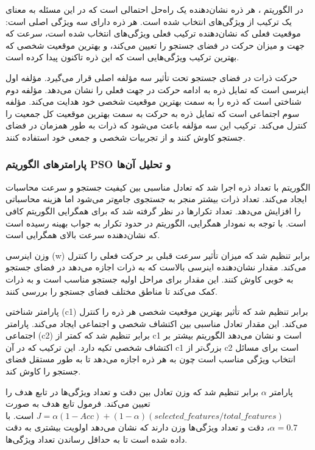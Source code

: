 \documentclass{article}
\begin{document}
در الگوریتم ، هر ذره نشان‌دهنده یک راه‌حل احتمالی است که در این مسئله به معنای یک ترکیب از ویژگی‌های انتخاب شده است. هر ذره دارای سه ویژگی اصلی است: موقعیت فعلی که نشان‌دهنده ترکیب فعلی ویژگی‌های انتخاب شده است، سرعت که جهت و میزان حرکت در فضای جستجو را تعیین می‌کند، و بهترین موقعیت شخصی که بهترین ترکیب ویژگی‌هایی است که این ذره تاکنون پیدا کرده است.

حرکت ذرات در فضای جستجو تحت تأثیر سه مؤلفه اصلی قرار می‌گیرد. مؤلفه اول اینرسی است که تمایل ذره به ادامه حرکت در جهت فعلی را نشان می‌دهد. مؤلفه دوم شناختی است که ذره را به سمت بهترین موقعیت شخصی خود هدایت می‌کند. مؤلفه سوم اجتماعی است که تمایل ذره به حرکت به سمت بهترین موقعیت کل جمعیت را کنترل می‌کند. ترکیب این سه مؤلفه باعث می‌شود که ذرات به طور همزمان در فضای جستجو کاوش کنند و از تجربیات شخصی و جمعی خود استفاده کنند.

\subsubsection{پارامترهای الگوریتم PSO و تحلیل آن‌ها}

الگوریتم  با تعداد  ذره اجرا شد که تعادل مناسبی بین کیفیت جستجو و سرعت محاسبات ایجاد می‌کند. تعداد ذرات بیشتر منجر به جستجوی جامع‌تر می‌شود اما هزینه محاسباتی را افزایش می‌دهد. تعداد تکرارها  در نظر گرفته شد که برای همگرایی الگوریتم کافی است. با توجه به نمودار همگرایی، الگوریتم در حدود تکرار  به جواب بهینه رسیده است که نشان‌دهنده سرعت بالای همگرایی است.

وزن اینرسی (w) برابر  تنظیم شد که میزان تأثیر سرعت قبلی بر حرکت فعلی را کنترل می‌کند. مقدار  نشان‌دهنده اینرسی بالاست که به ذرات اجازه می‌دهد در فضای جستجو به خوبی کاوش کنند. این مقدار برای مراحل اولیه جستجو مناسب است و به ذرات کمک می‌کند تا مناطق مختلف فضای جستجو را بررسی کنند.

پارامتر شناختی (c1) برابر  تنظیم شد که تأثیر بهترین موقعیت شخصی هر ذره را کنترل می‌کند. این مقدار تعادل مناسبی بین اکتشاف شخصی و اجتماعی ایجاد می‌کند. پارامتر اجتماعی (c2) برابر  تنظیم شد که کمتر از c1 است و نشان می‌دهد الگوریتم بیشتر بر اکتشاف شخصی تکیه دارد. این ترکیب که در آن c1 بزرگ‌تر از c2 است برای مسائل انتخاب ویژگی مناسب است چون به هر ذره اجازه می‌دهد تا به طور مستقل فضای جستجو را کاوش کند.

پارامتر $\alpha$ برابر  تنظیم شد که وزن تعادل بین دقت و تعداد ویژگی‌ها در تابع هدف را تعیین می‌کند. فرمول تابع هدف به صورت $J = \alpha(1 - Acc) + (1 - \alpha)(selected\_features / total\_features)$ است. با $\alpha = 0.7$، دقت  و تعداد ویژگی‌ها  وزن دارند که نشان می‌دهد اولویت بیشتری به دقت داده شده است تا به حداقل رساندن تعداد ویژگی‌ها.
\end{document}
